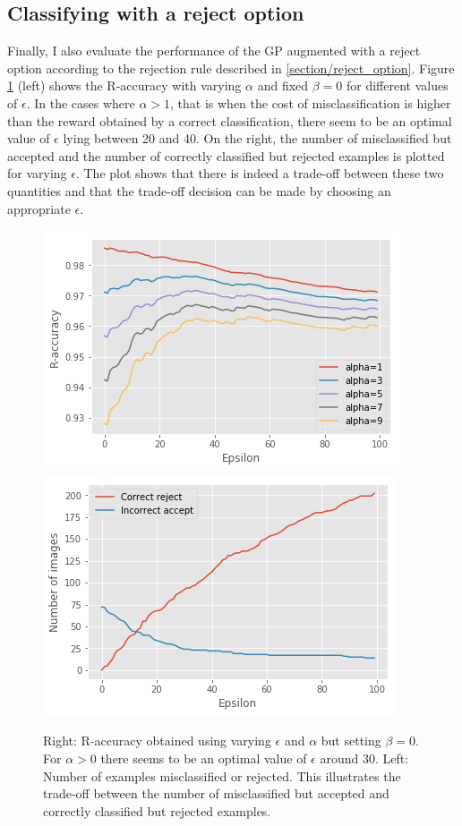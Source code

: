 \documentclass{article}
\begin{document}
\subsection{Classifying with a reject option}
Finally, I also evaluate the performance of the GP augmented with a reject option according to the rejection rule described in \ref{section/reject_option}. Figure \ref{fig/r_accs_alpha_mnist} (left) shows the R-accuracy with varying $\alpha$ and fixed $\beta=0$ for different values of $\epsilon$. In the cases where $\alpha > 1$, that is when the cost of misclassification is higher than the reward obtained by a correct classification, there seem to be an optimal value of $\epsilon$ lying between 20 and 40. On the right, the number of misclassified but accepted and the number of correctly classified but rejected examples is plotted for varying $\epsilon$. The plot shows that there is indeed a trade-off between these two quantities and that the trade-off decision can be made by choosing an appropriate $\epsilon$.

\begin{figure}[h]
	\centering
	\includegraphics[scale=0.48]{r_accs_alpha_mnist}
	\includegraphics[scale=0.48]{r_acc_mnist}
	\caption{Right: R-accuracy obtained using varying $\epsilon$ and $\alpha$ but setting $\beta=0$. For $\alpha>0$ there seems to be an optimal value of $\epsilon$ around 30. Left: Number of examples misclassified or rejected. This illustrates the trade-off between the number of misclassified but accepted and correctly classified but rejected examples.}
	\label{fig/r_accs_alpha_mnist}
\end{figure}
\end{document}
